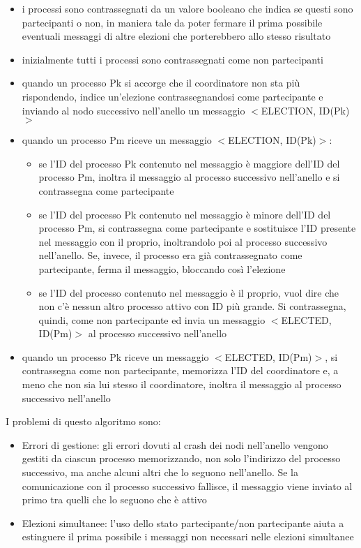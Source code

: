\begin{itemize}
    \item i processi sono contrassegnati da un valore booleano che indica se questi sono partecipanti o non, in maniera tale da poter fermare il prima possibile eventuali messaggi di altre elezioni che porterebbero allo stesso risultato
    \item inizialmente tutti i processi sono contrassegnati come non partecipanti 
    \item quando un processo Pk si accorge che il coordinatore non sta più rispondendo, indice un'elezione contrassegnandosi come partecipante e inviando al nodo successivo nell'anello un messaggio $<$ELECTION, ID(Pk)$>$
    \item quando un processo Pm riceve un messaggio $<$ELECTION, ID(Pk)$>$:
    \begin{itemize}
        \item se l'ID del processo Pk contenuto nel messaggio è maggiore dell'ID del processo Pm, inoltra il messaggio al processo successivo nell'anello e si contrassegna come partecipante
        \item  se l'ID del processo Pk contenuto nel messaggio è minore dell'ID del processo Pm, si contrassegna come partecipante e sostituisce l'ID presente nel messaggio con il proprio, inoltrandolo poi al processo successivo nell'anello. Se, invece, il processo era già contrassegnato come partecipante, ferma il messaggio, bloccando così l'elezione
        \item se l'ID del processo contenuto nel messaggio è il proprio, vuol dire che non c'è nessun altro processo attivo con ID più grande. Si contrassegna, quindi, come non partecipante ed invia un messaggio $<$ELECTED, ID(Pm)$>$ al processo successivo nell'anello
    \end{itemize}
    \item quando un processo Pk riceve un messaggio $<$ELECTED, ID(Pm)$>$, si contrassegna come non partecipante, memorizza l'ID del coordinatore e, a meno che non sia lui stesso il coordinatore, inoltra il messaggio al processo successivo nell'anello
\end{itemize}

I problemi di questo algoritmo sono:

\begin{itemize}
    \item Errori di gestione: gli errori dovuti al crash dei nodi nell'anello vengono gestiti da ciascun processo memorizzando, non solo l'indirizzo del processo successivo, ma anche alcuni altri che lo seguono nell'anello. Se la comunicazione con il processo successivo fallisce, il messaggio viene inviato al primo tra quelli che lo seguono che è attivo
    \item Elezioni simultanee: l'uso dello stato partecipante/non partecipante aiuta a estinguere il prima possibile i messaggi non necessari nelle elezioni simultanee 
\end{itemize}

